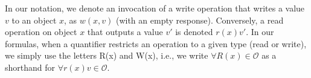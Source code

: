 \documentclass[journal,compsoc]{IEEEtran}
\begin{document}
\newtheorem{definition}{Definition}



In our notation, we denote an invocation of a write operation that writes a value $v$ to an object $x$, as $w(x,v)$ (with an empty response). Conversely, a read operation on object $x$ that outputs a value $v'$ is denoted $r(x){v'}$. %
 \def\tuple#1{\langle #1\rangle}
In our formulas, when a quantifier restricts an operation to a given type (read or write), we simply use the letters R(x) and W(x), i.e., we write $\forall R(x) \in \mathcal{O}$ as a shorthand for $\forall r(x){v} \in \mathcal{O}$.

\end{document}
